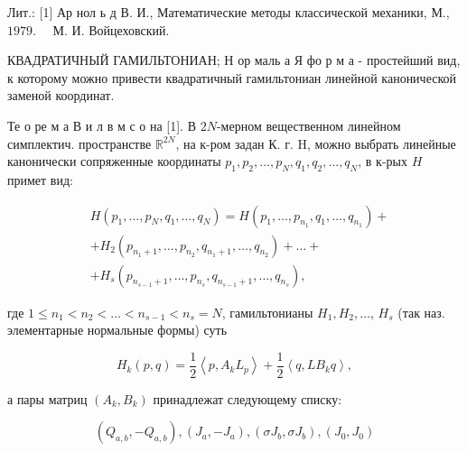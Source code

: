 \documentclass[10pt]{article}
\begin{document}
Лит.: [1] Ар нол ь д В. И., Математические методы классической механики, М., $1979 . \quad$ М. И. Войцеховский.



КВАДРАТИЧНЫЙ ГАМИЛЬТОНИАН; Н ор маль а Я фо р м а - простейший вид, к которому можно привести квадратичный гамильтониан линейной канонической заменой координат.



Те о ре м а В и л в м с о на [1]. В $2 N$-мерном вещественном линейном симплектич. пространстве $\mathbb{R}^{2 N}$, на к-ром задан К. г. H, можно выбрать линейные канонически сопряженные координаты $p_{1}, p_{2}, \ldots, p_{N}, q_{1}, q_{2}, \ldots, q_{N}$, в к-рых $H$ примет вид:



\[

\begin{aligned}

& H\left(p_{1}, \ldots, p_{N}, q_{1}, \ldots, q_{N}\right)=H\left(p_{1}, \ldots, p_{n_{1}}, q_{1}, \ldots, q_{n_{1}}\right)+ \\

& +H_{2}\left(p_{n_{1}+1}, \ldots, p_{n_{2}}, q_{n_{1}+1}, \ldots, q_{n_{2}}\right)+\ldots+ \\

& +H_{s}\left(p_{n_{s-1}+1}, \ldots, p_{n_{s}}, q_{n_{s-1}+1}, \ldots, q_{n_{s}}\right) \text {, }

\end{aligned}

\]



где $1 \leqslant n_{1}<n_{2}<\ldots<n_{s-1}<n_{s}=N$, гамильтонианы $H_{1}, H_{2}, \ldots$, $H_{s}$ (так наз. элементарные нормальные формы) суть



\[

H_{k}(p, q)=\frac{1}{2}\left\langle p, A_{k} L_{p}\right\rangle+\frac{1}{2}\left\langle q, L B_{k} q\right\rangle,

\]



а пары матриц $\left(A_{k}, B_{k}\right)$ принадлежат следующему списку:



\[

\left(Q_{a, b},-Q_{a, b}\right),\left(J_{a},-J_{a}\right),\left(\sigma J_{b}, \sigma J_{b}\right),\left(J_{0}, J_{0}\right)

\]
\end{document}
